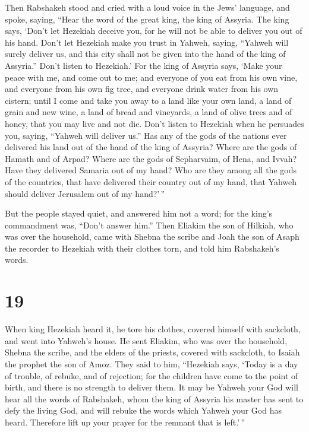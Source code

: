  Then Rabshakeh stood and cried with a loud voice in the
Jews' language, and spoke, saying, ``Hear the word of the great king,
the king of Assyria.  The king says, `Don't let Hezekiah
deceive you, for he will not be able to deliver you out of his hand.
 Don't let Hezekiah make you trust in Yahweh, saying,
``Yahweh will surely deliver us, and this city shall not be given into
the hand of the king of Assyria.''  Don't listen to
Hezekiah.' For the king of Assyria says, `Make your peace with me, and
come out to me; and everyone of you eat from his own vine, and everyone
from his own fig tree, and everyone drink water from his own cistern;
 until I come and take you away to a land like your own
land, a land of grain and new wine, a land of bread and vineyards, a
land of olive trees and of honey, that you may live and not die. Don't
listen to Hezekiah when he persuades you, saying, ``Yahweh will deliver
us.''  Has any of the gods of the nations ever delivered
his land out of the hand of the king of Assyria?  Where are
the gods of Hamath and of Arpad? Where are the gods of Sepharvaim, of
Hena, and Ivvah? Have they delivered Samaria out of my hand?
 Who are they among all the gods of the countries, that
have delivered their country out of my hand, that Yahweh should deliver
Jerusalem out of my hand?'\,''

 But the people stayed quiet, and answered him not a word;
for the king's commandment was, ``Don't answer him.''  Then
Eliakim the son of Hilkiah, who was over the household, came with Shebna
the scribe and Joah the son of Asaph the recorder to Hezekiah with their
clothes torn, and told him Rabshakeh's words.

\hypertarget{section-18}{%
\section{19}\label{section-18}}

 When king Hezekiah heard it, he tore his clothes, covered
himself with sackcloth, and went into Yahweh's house.  He
sent Eliakim, who was over the household, Shebna the scribe, and the
elders of the priests, covered with sackcloth, to Isaiah the prophet the
son of Amoz.  They said to him, ``Hezekiah says, `Today is a
day of trouble, of rebuke, and of rejection; for the children have come
to the point of birth, and there is no strength to deliver them.
 It may be Yahweh your God will hear all the words of
Rabshakeh, whom the king of Assyria his master has sent to defy the
living God, and will rebuke the words which Yahweh your God has heard.
Therefore lift up your prayer for the remnant that is left.'\,''

